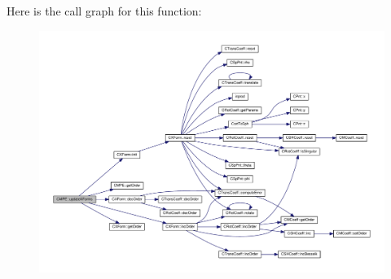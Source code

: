 Here is the call graph for this function\-:\nopagebreak
\begin{figure}[H]
\begin{center}
\leavevmode
\includegraphics[width=350pt]{classCMPE_a65d2f19a87b451dbd84bb4b11cbfd571_cgraph}
\end{center}
\end{figure}




